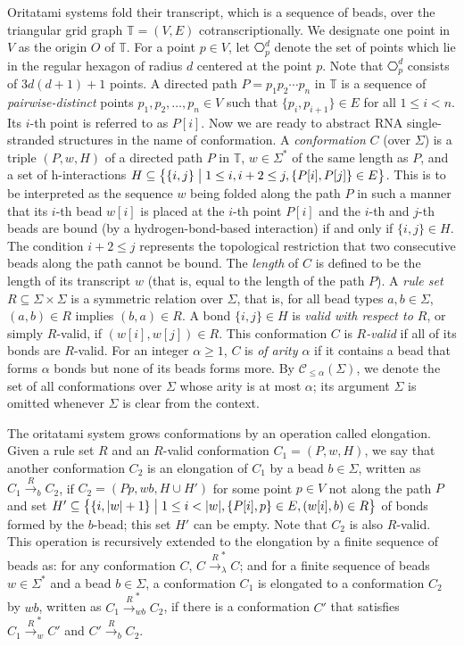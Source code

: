 \documentclass[runningheads]{llncs}
\begin{document}
Oritatami systems fold their transcript, which is a sequence of beads, over the triangular grid graph $\mathbb{T} = (V, E)$ cotranscriptionally. %
We designate one point in $V$ as the origin $O$ of $\mathbb{T}$. 
For a point $p \in V$, let $\hexagon_p^d$ denote the set of points which lie in the regular hexagon of radius $d$ centered at the point $p$. 
Note that $\hexagon_p^d$ consists of $3d(d+1)+1$ points. %
A directed path $P = p_1 p_2 \cdots p_n$ in $\mathbb{T}$ is a sequence of \textit{pairwise-distinct} points $p_1, p_2, \ldots, p_n \in V$ such that $\{p_i, p_{i+1}\} \in E$ for all $1 \le i < n$. 
Its $i$-th point is referred to as $P[i]$. 
Now we are ready to abstract RNA single-stranded structures in the name of conformation. 
A \textit{conformation} $C$ (over $\Sigma$) is a triple $(P, w, H)$ of a directed path $P$ in $\mathbb{T}$, $w \in \Sigma^*$ of the same length as $P$, and a set of h-interactions $H \subseteq \bigl\{\{i, j\} \bigm| 1 \le i, i+2 \le j, \{P[i], P[j]\} \in E \bigr\}$. 
This is to be interpreted as the sequence $w$ being folded along the path $P$ in such a manner that its $i$-th bead $w[i]$ is placed at the $i$-th point $P[i]$ and the $i$-th and $j$-th beads are bound (by a hydrogen-bond-based interaction) if and only if $\{i, j\} \in H$. 
The condition $i+2 \le j$ represents the topological restriction that two consecutive beads along the path cannot be bound. 
The \textit{length} of $C$ is defined to be the length of its transcript $w$ (that is, equal to the length of the path $P$). 
A \textit{rule set} $R \subseteq \Sigma \times \Sigma$ is a symmetric relation over $\Sigma$, that is, for all bead types $a, b \in \Sigma$, $(a, b) \in R$ implies $(b, a) \in R$.
A bond $\{i, j\} \in H$ is \textit{valid with respect to $R$}, or simply $R$-valid, if $(w[i], w[j]) \in R$. 
This conformation $C$ is \textit{$R$-valid} if all of its bonds are $R$-valid. %
For an integer $\alpha \ge 1$, $C$ is \textit{of arity $\alpha$} if it contains a bead that forms $\alpha$ bonds but none of its beads forms more. 
By $\mathcal{C}_{\le \alpha}(\Sigma)$, we denote the set of all conformations over $\Sigma$ whose arity is at most $\alpha$; its argument $\Sigma$ is omitted whenever $\Sigma$ is clear from the context. 

The oritatami system grows conformations by an operation called elongation. 
Given a rule set $R$ and an $R$-valid conformation $C_1 = (P, w, H)$, we say that another conformation $C_2$ is an elongation of $C_1$ by a bead $b \in \Sigma$, written as $C_1 \xrightarrow{R}_b C_2$, if $C_2 = (P p, wb, H \cup H')$ for some point $p \in V$ not along the path $P$ and set $H' \subseteq \bigl\{ \{i, |w|+1\} \bigm| 1 \le i < |w|, \{P[i], p\} \in E, (w[i], b) \in R \bigr\}$ of bonds formed by the $b$-bead; this set $H'$ can be empty. 
Note that $C_2$ is also $R$-valid. 
This operation is recursively extended to the elongation by a finite sequence of beads as: for any conformation $C$, $C \xrightarrow{R}_\lambda^* C$; and for a finite sequence of beads $w \in \Sigma^*$ and a bead $b \in \Sigma$, a conformation $C_1$ is elongated to a conformation $C_2$ by $wb$, written as $C_1 \xrightarrow{R}_{wb}^* C_2$, if there is a conformation $C'$ that satisfies $C_1 \xrightarrow{R}_w^* C'$ and $C' \xrightarrow{R}_b C_2$. 
\end{document}
